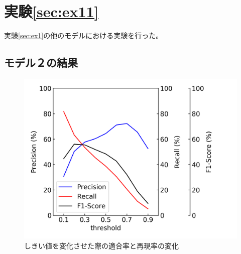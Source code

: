 \section{実験\ref{sec:ex11}}
実験\ref{sec:ex1}の他のモデルにおける実験を行った。

\newpage
\subsection{モデル２の結果}
\begin{figure}[htbp]
    \begin{center}
        \includegraphics[width=150mm]{./fig/densenet121_e_p02threshold.png}
        \caption{しきい値を変化させた際の適合率と再現率の変化}
        \label{fig:densenet121_e_result_threshold}
    \end{center}
\end{figure}

\newpage
